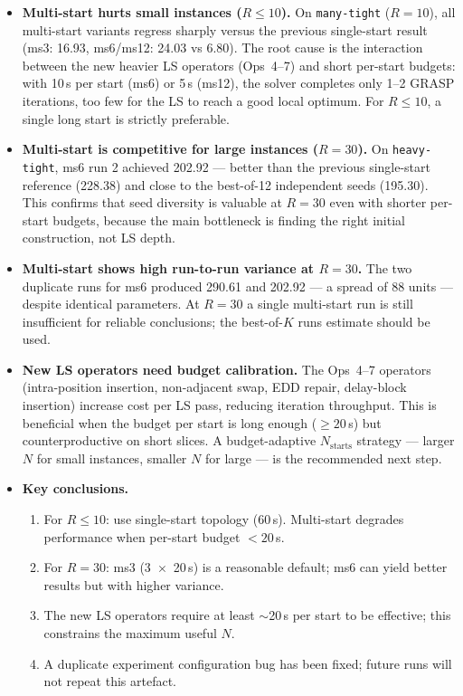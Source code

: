 \begin{itemize}

    \item \textbf{Multi-start hurts small instances ($R \leq 10$).}
    On \texttt{many-tight} ($R=10$), all multi-start variants regress
    sharply versus the previous single-start result (ms3: 16.93, ms6/ms12:
    24.03 vs 6.80).  The root cause is the interaction between the new
    heavier LS operators (Ops~4–7) and short per-start budgets: with 10\,s
    per start (ms6) or 5\,s (ms12), the solver completes only 1–2 GRASP
    iterations, too few for the LS to reach a good local optimum.
    For $R \leq 10$, a single long start is strictly preferable.

    \item \textbf{Multi-start is competitive for large instances ($R=30$).}
    On \texttt{heavy-tight}, ms6 run 2 achieved 202.92 — better than the
    previous single-start reference (228.38) and close to the best-of-12
    independent seeds (195.30).  This confirms that seed diversity is
    valuable at $R=30$ even with shorter per-start budgets, because the
    main bottleneck is finding the right initial construction, not LS depth.

    \item \textbf{Multi-start shows high run-to-run variance at $R=30$.}
    The two duplicate runs for ms6 produced 290.61 and 202.92 — a spread
    of 88 units — despite identical parameters.  At $R=30$ a single
    multi-start run is still insufficient for reliable conclusions; the
    best-of-$K$ runs estimate should be used.

    \item \textbf{New LS operators need budget calibration.}
    The Ops~4–7 operators (intra-position insertion, non-adjacent swap, EDD
    repair, delay-block insertion) increase cost per LS pass, reducing
    iteration throughput.  This is beneficial when the budget per start is
    long enough ($\geq 20$\,s) but counterproductive on short slices.
    A budget-adaptive $N_{\text{starts}}$ strategy — larger $N$ for small
    instances, smaller $N$ for large — is the recommended next step.

    \item \textbf{Key conclusions.}
    \begin{enumerate}[noitemsep]
        \item For $R \leq 10$: use single-start topology (60\,s).
              Multi-start degrades performance when per-start budget $< 20$\,s.
        \item For $R = 30$: ms3 (3~$\times$~20\,s) is a reasonable default;
              ms6 can yield better results but with higher variance.
        \item The new LS operators require at least $\sim$20\,s per start
              to be effective; this constrains the maximum useful $N$.
        \item A duplicate experiment configuration bug has been fixed;
              future runs will not repeat this artefact.
    \end{enumerate}

\end{itemize}

